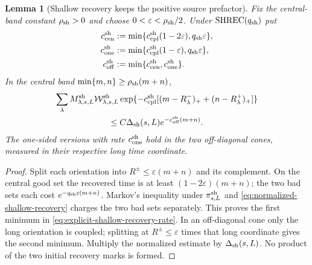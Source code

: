 \documentclass[11pt]{article}
\newtheorem{lemma}[theorem]{Lemma}
\begin{document}
\begin{lemma}[Shallow recovery keeps the positive source prefactor]
\label{lem:normalized-shallow-recovery}
Fix the central-band constant $\rho_{\rm sh}>0$ and choose
$0<\varepsilon<\rho_{\rm sh}/2$.  Under
$\mathrm{SHREC}(q_{\rm sh})$ put
\begin{equation}
\label{eq:explicit-shallow-recovery-rate}
 \begin{aligned}
 c_{\rm cen}^{\rm sh}&:=
 \min\{c_{\rm cpl}^{\rm sh}(1-2\varepsilon),q_{\rm sh}\varepsilon\},\\
 c_{\rm one}^{\rm sh}&:=
 \min\{c_{\rm cpl}^{\rm sh}(1-\varepsilon),q_{\rm sh}\varepsilon\},\\
 c_{\rm off}^{\rm sh}&:=\min\{c_{\rm cen}^{\rm sh},c_{\rm one}^{\rm sh}\}.
 \end{aligned}
\end{equation}
In the central band $\min\{m,n\}\ge\rho_{\rm sh}(m+n)$,
\begin{multline}
\label{eq:weighted-shallow-delayed-coupling}
 \sum_\lambda M^{\rm sh}_{\lambda,s,L}
 \mathcal W^{\rm sh}_{\lambda,s,L}
 \exp\{-c_{\rm cpl}^{\rm sh}[(m-R^-_\lambda)_+
 +(n-R^+_\lambda)_+]\}\\
 \le C\Delta_{\rm sh}(s,L)e^{-c_{\rm off}^{\rm sh}(m+n)} .
\end{multline}
The one-sided versions with rate $c_{\rm one}^{\rm sh}$ hold in the two
off-diagonal cones, measured in their respective long time coordinate.
\end{lemma}

\begin{proof}
Split each orientation into $R^\pm\le\varepsilon(m+n)$ and its complement.
On the central good set the recovered time is at least
$(1-2\varepsilon)(m+n)$; the two bad sets each cost
$e^{-q_{\rm sh}\varepsilon(m+n)}$.  Markov's inequality under
$\pi^{\rm sh}_{s,L}$ and
\eqref{eq:normalized-shallow-recovery} charges the two bad sets separately.
This proves the first minimum in
\eqref{eq:explicit-shallow-recovery-rate}.  In an off-diagonal cone only the
long orientation is coupled; splitting at $R^\pm\le\varepsilon$ times that
long coordinate gives the second minimum.  Multiply the normalized estimate
by $\Delta_{\rm sh}(s,L)$.  No product of the two initial recovery marks is
formed.
\end{proof}
\end{document}
